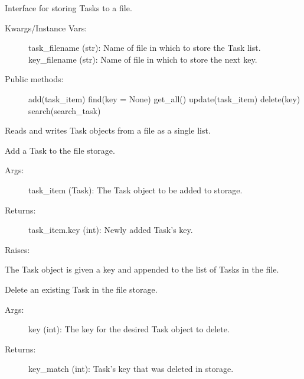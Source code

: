 \documentclass[letterpaper,10pt,english]{sphinxmanual}
\begin{document}
\begin{fulllineitems}
\label{index:storage.FileStorage}
Interface for storing Tasks to a file.
\begin{description}
\item[{Kwargs/Instance Vars:}] \leavevmode
task\_filename (str): Name of file in which to store the Task list.
key\_filename (str): Name of file in which to store the next key.

\item[{Public methods:}] \leavevmode
add(task\_item)
find(key = None)
get\_all()
update(task\_item)
delete(key)
search(search\_task)

\end{description}

Reads and writes Task objects from a file as a single list.


\begin{fulllineitems}
\label{index:storage.FileStorage.add}
Add a Task to the file storage.
\begin{description}
\item[{Args:}] \leavevmode
task\_item (Task): The Task object to be added to storage.

\item[{Returns:}] \leavevmode
task\_item.key (int): Newly added Task's key.

\end{description}

Raises:

The Task object is given a key and appended to the list of Tasks in the file.

\end{fulllineitems}



\begin{fulllineitems}
\label{index:storage.FileStorage.delete}
Delete an existing Task in the file storage.
\begin{description}
\item[{Args:}] \leavevmode
key (int): The key for the desired Task object to delete.

\item[{Returns:}] \leavevmode
key\_match (int): Task's key that was deleted in storage.


\end{description}
\end{fulllineitems}
\end{fulllineitems}
\end{document}

